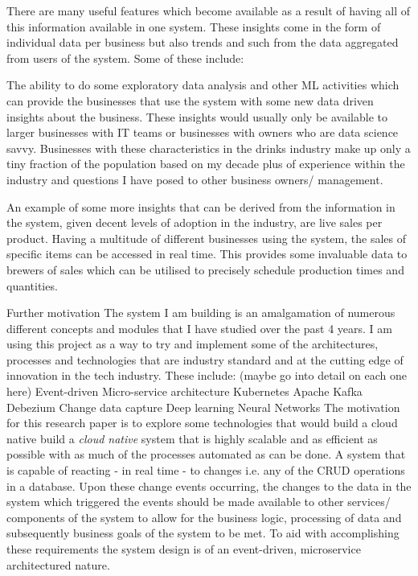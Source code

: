 \begin{flushleft}
	There are many useful features which become available as a result of having all of this information available in one system. These insights come in the form of individual data per business but also trends and such from the data aggregated from users of the system. Some of these include:

	The ability to do some exploratory data analysis and other ML activities which can provide the businesses that use the system with some new data driven insights about the business. These insights would usually only be available to larger businesses with IT teams or businesses with owners who are data science savvy. Businesses with these characteristics in the drinks industry make up only a tiny fraction of the population based on my decade plus of experience within the industry and questions I have posed to other business owners/ management.

	An example of some more insights that can be derived from the information in the system, given decent levels of adoption in the industry, are live sales per product. Having a multitude of different businesses using the system, the sales of specific items can be accessed in real time. This provides some invaluable data to brewers of sales which can be utilised to precisely schedule production times and quantities.

	Further motivation
	The system I am building is an amalgamation of numerous different concepts and modules that I have studied over the past 4 years. I am using this project as a way to try and implement some of the architectures, processes and technologies that are industry standard and at the cutting edge of innovation in the tech industry. These include: (maybe go into detail on each one here)
	Event-driven Micro-service architecture
	Kubernetes
	Apache Kafka
	Debezium Change data capture
	Deep learning Neural Networks
	\bigbreak
	The motivation for this research paper is to explore some technologies that would build a cloud native build a \emph{cloud native} system that
	is highly scalable and as efficient as possible with as much of the processes automated as can be done.\newline
	A system that is capable of reacting - in real time - to changes i.e. any of the CRUD operations in a database. \newline
	Upon these change events occurring, the changes to the data in the system which triggered the events should be made
	available to other services/ components of the system to allow for the business logic, processing of data and subsequently
	business goals of the system to be met.
	To aid with accomplishing these requirements the system design is of an event-driven, microservice architectured nature.
	\newline

\end{flushleft}
